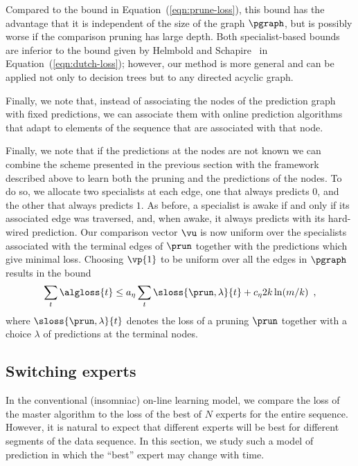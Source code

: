 Compared to the bound in Equation~(\ref{eqn:prune-loss}), this bound
has the advantage that it is independent of the size of the graph
$\pgraph$, but is possibly worse if the comparison pruning has large depth.
Both specialist-based bounds
are inferior to the bound given by Helmbold and
Schapire~\cite{HelmboldSc95} in Equation~(\ref{eqn:dutch-loss});
however, our method is more general
and can be applied not only to decision trees but to any directed acyclic
graph.

Finally, we note that, instead of associating the nodes of the prediction
graph with fixed predictions, we can associate them with online
prediction algorithms that adapt to elements of the sequence that are
associated with that node.

\ifflase
Finally, we note that if the predictions at
the nodes are not known we can combine the scheme presented in the
previous section with the framework described above to learn both the
pruning and the predictions of the nodes.
To do so, we allocate
two specialists at each edge, one that always predicts $0$, and the
other that always predicts $1$. As before, a specialist is awake if
and only if
its associated edge was traversed, and, when
awake, it always
predicts with its hard-wired prediction.
Our comparison vector $\vu$ is now uniform over the specialists
associated with the terminal edges of $\prun$ together with the
predictions which give minimal loss.
Choosing $\vp{1}$ to be uniform over all the edges in $\pgraph$
results in the bound
\[\sum_{t} \algloss{t} \leq
a_\eta \sum_{t} \sloss{\prun,\lambda}{t} + c_\eta 2 k \ln(m/k) \enspace ,
\]
where $\sloss{\prun,\lambda}{t}$ denotes the loss of a pruning $\prun$
together with a choice $\lambda$ of predictions at the terminal nodes.
\fi

\subsection{Switching experts}

In the conventional (insomniac) on-line learning model, we compare the
loss of the master algorithm to the loss of the best of $N$ experts
for the entire sequence.
However, it is natural to expect that different experts will be best
for different segments of the data sequence.
In this section, we study such a model of prediction in which the
``best'' expert may change with time.

